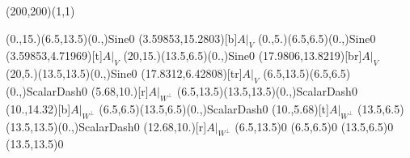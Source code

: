 \unitlength=1bp%

\begin{feynartspicture}(200,200)(1,1)

\FADiagram{}
\FAProp(0.,15.)(6.5,13.5)(0.,){Sine}{0}
\FALabel(3.59853,15.2803)[b]{$A|_V$}
\FAProp(0.,5.)(6.5,6.5)(0.,){Sine}{0}
\FALabel(3.59853,4.71969)[t]{$A|_V$}
\FAProp(20,15.)(13.5,6.5)(0.,){Sine}{0}
\FALabel(17.9806,13.8219)[br]{$A|_V$}
\FAProp(20,5.)(13.5,13.5)(0.,){Sine}{0}
\FALabel(17.8312,6.42808)[tr]{$A|_V$}
\FAProp(6.5,13.5)(6.5,6.5)(0.,){ScalarDash}{0}
\FALabel(5.68,10.)[r]{$A|_{W^\perp}$}
\FAProp(6.5,13.5)(13.5,13.5)(0.,){ScalarDash}{0}
\FALabel(10.,14.32)[b]{$A|_{W^\perp}$}
\FAProp(6.5,6.5)(13.5,6.5)(0.,){ScalarDash}{0}
\FALabel(10.,5.68)[t]{$A|_{W^\perp}$}
\FAProp(13.5,6.5)(13.5,13.5)(0.,){ScalarDash}{0}
\FALabel(12.68,10.)[r]{$A|_{W^\perp}$}
\FAVert(6.5,13.5){0}
\FAVert(6.5,6.5){0}
\FAVert(13.5,6.5){0}
\FAVert(13.5,13.5){0}
\end{feynartspicture}


